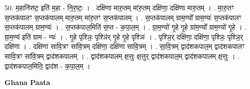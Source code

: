 \documentclass[17pt]{extarticle}
\begin{document}
50. म॒हानि॑रष्ट॒ इति॑ म॒हा - नि॒र॒ष्टः॒ । . दक्षि॑णा मारु॒तम् मा॑रु॒तम् दक्षि॑णा॒ दक्षि॑णा मारु॒तम् । . मा॒रु॒तꣳ स॒प्तक॑पालꣳ स॒प्तक॑पालम् मारु॒तम् मा॑रु॒तꣳ स॒प्तक॑पालम् । . स॒प्तक॑पालम् ग्राम॒ण्यो᳚ ग्राम॒ण्यः॑ स॒प्तक॑पालꣳ स॒प्तक॑पालम् ग्राम॒ण्यः॑ । . स॒प्तक॑पाल॒मिति॑ स॒प्त - क॒पा॒ल॒म् । . ग्रा॒म॒ण्यो॑ गृ॒हे गृ॒हे ग्रा॑म॒ण्यो᳚ ग्राम॒ण्यो॑ गृ॒हे । . ग्रा॒म॒ण्य॑ इति॑ ग्राम - न्यः॑ । . गृ॒हे पृश्ञिः॒ पृश्ञि॑र् गृ॒हे गृ॒हे पृश्ञिः॑ । . पृश्ञि॒र् दक्षि॑णा॒ दक्षि॑णा॒ पृश्ञिः॒ पृश्ञि॒र् दक्षि॑णा । . दक्षि॑णा सावि॒त्रꣳ सा॑वि॒त्रम् दक्षि॑णा॒ दक्षि॑णा सावि॒त्रम् । . सा॒वि॒त्रम् द्वाद॑शकपाल॒म् द्वाद॑शकपालꣳ सावि॒त्रꣳ सा॑वि॒त्रम् द्वाद॑शकपालम् । . द्वाद॑शकपालम् क्ष॒त्तुः क्ष॒त्तुर् द्वाद॑शकपाल॒म् द्वाद॑शकपालम् क्ष॒त्तुः । . द्वाद॑शकपाल॒मिति॒ द्वाद॑श - क॒पा॒ल॒म् । \newline

\textbf{Ghana Paata } \newline
\end{document}
